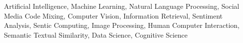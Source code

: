 {Artificial Intelligence, Machine Learning, Natural Language Processing, Social Media Code Mixing, Computer Vision,  Information Retrieval, Sentiment Analysis, Sentic Computing, Image Processing, Human Computer Interaction, Semantic Textual Similarity, Data Science, Cognitive Science}